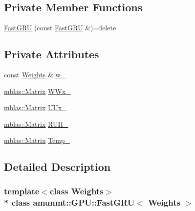\subsection*{Private Member Functions}
\begin{DoxyCompactItemize}
\item 
\hyperlink{classamunmt_1_1GPU_1_1FastGRU_affbc095bb02e7ee6e50995d5dbdd12a0}{Fast\+G\+RU} (const \hyperlink{classamunmt_1_1GPU_1_1FastGRU}{Fast\+G\+RU} \&)=delete
\end{DoxyCompactItemize}
\subsection*{Private Attributes}
\begin{DoxyCompactItemize}
\item 
const \hyperlink{structamunmt_1_1GPU_1_1Weights}{Weights} \& \hyperlink{classamunmt_1_1GPU_1_1FastGRU_a299bff28c9a4fb76e3fdf423137e24a2}{w\+\_\+}
\item 
\hyperlink{namespaceamunmt_1_1GPU_1_1mblas_ab67821a8254de53e45a623cf73c0aef6}{mblas\+::\+Matrix} \hyperlink{classamunmt_1_1GPU_1_1FastGRU_ae7d4a31966763ba9c724d6c5668f672b}{W\+Wx\+\_\+}
\item 
\hyperlink{namespaceamunmt_1_1GPU_1_1mblas_ab67821a8254de53e45a623cf73c0aef6}{mblas\+::\+Matrix} \hyperlink{classamunmt_1_1GPU_1_1FastGRU_a59f623c97d07e31cf4714655acb724d7}{U\+Ux\+\_\+}
\item 
\hyperlink{namespaceamunmt_1_1GPU_1_1mblas_ab67821a8254de53e45a623cf73c0aef6}{mblas\+::\+Matrix} \hyperlink{classamunmt_1_1GPU_1_1FastGRU_a859346068a908bdf3226a12c759c45e8}{R\+U\+H\+\_\+}
\item 
\hyperlink{namespaceamunmt_1_1GPU_1_1mblas_ab67821a8254de53e45a623cf73c0aef6}{mblas\+::\+Matrix} \hyperlink{classamunmt_1_1GPU_1_1FastGRU_adb34d91baba03402316d2475efefb1ec}{Temp\+\_\+}
\end{DoxyCompactItemize}


\subsection{Detailed Description}
\subsubsection*{template$<$class Weights$>$\\*
class amunmt\+::\+G\+P\+U\+::\+Fast\+G\+R\+U$<$ Weights $>$}



